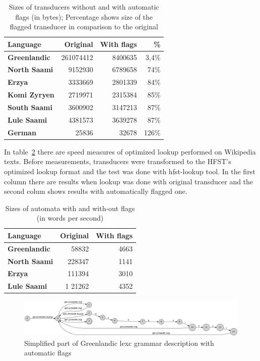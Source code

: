 \documentclass[11pt]{article}
\begin{document}
\begin{table}
    \centering
    \begin{tabular}{|l|r|r|r|}
        \hline
        \bf Language & \bf Original & \bf With flags & \bf \% \\
        \hline
        \bf Greenlandic &	261074412 	& 8400635 & 3,4\%  \\
        \bf North Saami &	9152930 	& 6789658 & 74\%  \\
        \bf Erzya		&	3333669 	& 2801339 & 84\%  \\
        \bf Komi Zyryen &	2719971 	& 2315384 & 85\%  \\
        \bf South Saami &	3600902 	& 3147213 & 87\%  \\
        \bf Lule Saami 	&	4381573 	& 3639278 & 87\%  \\
        \bf German 		&	25836 		& 32678   & 126\%  \\
        \hline
    \end{tabular}
    \caption{Sizes of transducers without and with automatic flags (in bytes); Percentage shows size of the flagged transducer in comparison to the original
    \label{table:sizes}}
\end{table}

In table~\ref{table:speed} there are speed measures of optimized lookup performed on Wikipedia texts. Before measurements, transducers were transformed to the HFST's optimized lookup format and the test was done with hfst-lookup tool. In the first column there are results when lookup was done with original transducer and the second colum shows results with automatically flagged one. 

\begin{table}
    \centering
    \begin{tabular}{|l|r|r|}
        \hline
        \bf Language & \bf Original & \bf With flags \\
        \hline
        \bf Greenlandic & 58832 & 4663\\
        \bf North Saami & 228347  & 1141 \\
        \bf Erzya & 111394  & 3010\\
        \bf Lule Saami & 1 21262 & 4352 \\
        \hline
    \end{tabular}
    \caption{Sizes of automata with and with-out flags (in words per second)
    \label{table:speed}}
\end{table}


\begin{figure}
    \includegraphics[width=\textwidth]{gr.png}
     \caption{Simplified part of Greenlandic lexc grammar description with automatic flags
     \label{fig:lexc-gr-flag}}
\end{figure}
\end{document}
